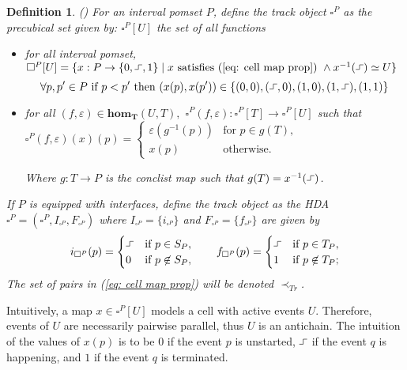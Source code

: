 \documentclass[11pt,a4paper,oldfontcommands]{memoir}
\newcommand*{\intpom}{\TrO}
\newcommand{\TrO}{\mathbf{T}}
\newcommand*\exec{%
  \raisebox{1pt}{%
    \begin{tikzpicture}[x=.8ex,y=1ex,-]
      \draw (0,0) -- (1,0) -- (1,1) -- (2,1);
    \end{tikzpicture}}}
\newcommand*\pobj[1]{\square^{#1}}
\newtheorem{definition}{Definition}
\begin{document}
\begin{definition} (\cite{LanguageofHDA,KleeneTh})
  \label{de:pobj}
  For an interval pomset $P$, define the track object $\pobj{ P}$ as the precubical set given by: $\pobj{ P}[U]$ the set of all functions
\begin{itemize}
      \item for all interval pomset, $\pobj{ P}[U]= \{ x: P \to \{0,\exec, 1 \} \mid x \text{ satisfies (\ref{eq: cell map prop}) }\wedge x^{-1}(\exec) \simeq U  \}$ 
     \begin{equation} \label{eq: cell map prop}
       \text{$\forall p, p' \in P$ if } p<p' \text{ then }(x(p), x(p')) \in \{(0,0),(\exec, 0),(1,0),(1,\exec),(1,1)\}
    \end{equation}
      \item for all $(f,\varepsilon) \in \mathbf{hom}_{\intpom}(U,T),$ $\square^P (f,\varepsilon): \square^P[T] \to \square^P[U]$ such that \newline
    $\square^P (f,\varepsilon)(x)(p)=    \begin{cases}
        \varepsilon(g^{-1}(p)) & \text{for $p\in g(T)$}, \\
        x(p) & \text{otherwise}.
      \end{cases}$
      
Where $g:T \to P$ is the conclist map such that $g(T)=x^{-1}(\exec)$.
  \end{itemize}
If $P$ is equipped with interfaces, define the track object as the HDA
  $\pobj{ P}=( \pobj{ P}, I_{ \pobj{P}}, F_{ \pobj{P}})$ where 
  $I_{ \pobj{ P}}=\{ i_{ \pobj{ P}}\}$ and
    $F_{ \pobj{ P}}=\{ f_{ \pobj{ P}}\}$ are given by
    \begin{equation*}
      i_{ \pobj{ P}}( p)=
      \begin{cases}
        \exec & \text{if } p\in S_P, \\
        0 & \text{if } p\not\in S_P,
      \end{cases}
      \qquad
      f_{ \pobj{ P}}( p)=
      \begin{cases}
        \exec & \text{if } p\in T_P, \\
        1 & \text{if } p\not\in T_P;
      \end{cases}
    \end{equation*}
  The set of pairs in (\ref{eq: cell map prop}) will be denoted ${\prec_{Tr}}$. %
\end{definition}
Intuitively, a map $x \in \pobj{ P}[U]$ models a cell with active events $U$. Therefore, events of $U$ are necessarily pairwise parallel, thus $U$ is an antichain. The intuition of the values of $x(p)$ is to be $0$ if the event $p$ is unstarted, $\exec$ if the event $q$ is happening, and $1$ if the event $q$ is terminated. 
\end{document}
